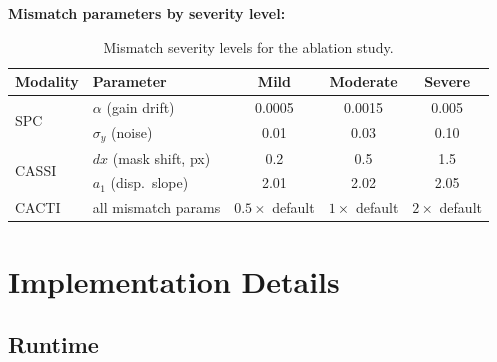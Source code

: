 \documentclass[runningheads]{llncs}
\begin{document}
\textbf{Mismatch parameters by severity level:}

\begin{table}[h]
\centering
\caption{Mismatch severity levels for the ablation study.}
\label{tab:severity_params}
\begin{tabular}{@{}llccc@{}}
\toprule
\textbf{Modality} & \textbf{Parameter} & \textbf{Mild} & \textbf{Moderate} & \textbf{Severe} \\
\midrule
\multirow{2}{*}{SPC} & $\alpha$ (gain drift) & 0.0005 & 0.0015 & 0.005 \\
& $\sigma_y$ (noise) & 0.01 & 0.03 & 0.10 \\
\midrule
\multirow{2}{*}{CASSI} & $dx$ (mask shift, px) & 0.2 & 0.5 & 1.5 \\
& $a_1$ (disp.\ slope) & 2.01 & 2.02 & 2.05 \\
\midrule
CACTI & all mismatch params & $0.5\times$ default & $1\times$ default & $2\times$ default \\
\bottomrule
\end{tabular}
\end{table}

\section{Implementation Details}
\label{sec:impl}

\subsection{Runtime}
\end{document}
